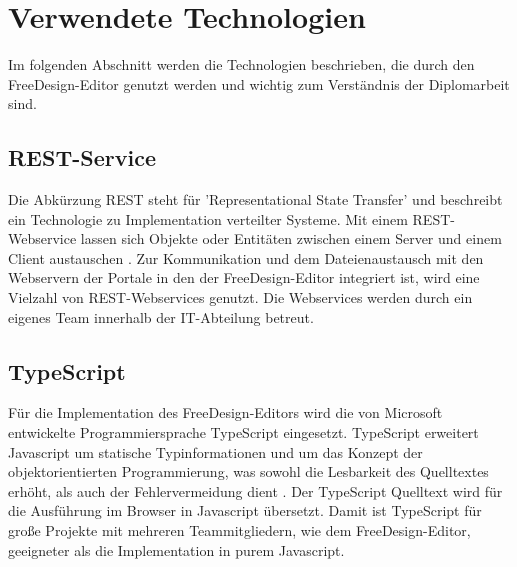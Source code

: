 \section{Verwendete Technologien}
Im folgenden Abschnitt werden die Technologien beschrieben, die durch den FreeDesign-Editor genutzt werden und wichtig zum Verständnis der Diplomarbeit sind. 

\subsection{REST-Service}
Die Abkürzung REST steht für 'Representational State Transfer' und beschreibt ein Technologie zu Implementation verteilter Systeme. Mit einem REST-Webservice lassen sich Objekte oder Entitäten zwischen einem Server und einem Client austauschen \autocite[vgl.][S. 105]{Spindler2014}. Zur Kommunikation und dem Dateienaustausch mit den Webservern der Portale in den der FreeDesign-Editor integriert ist, wird eine Vielzahl von REST-Webservices genutzt. Die Webservices werden durch ein eigenes Team innerhalb der IT-Abteilung betreut.  

\subsection{TypeScript}
Für die Implementation des FreeDesign-Editors wird die von Microsoft entwickelte Programmiersprache TypeScript eingesetzt. TypeScript erweitert Javascript um statische Typinformationen und um das Konzept der objektorientierten Programmierung, was sowohl die Lesbarkeit des Quelltextes erhöht, als auch der Fehlervermeidung dient \autocite[vgl.][S. 111]{Zeigermann2014}. Der TypeScript Quelltext wird für die Ausführung im Browser in Javascript übersetzt. Damit ist TypeScript für große Projekte mit mehreren Teammitgliedern, wie dem FreeDesign-Editor, geeigneter als die Implementation in purem Javascript.

